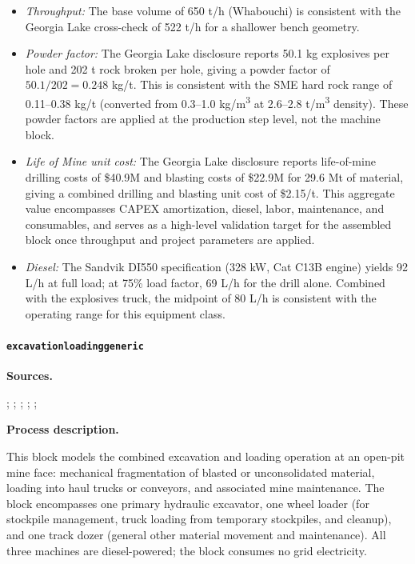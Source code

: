 \documentclass{article}
\renewcommand\_{\textunderscore\allowbreak}
\begin{document}
\begin{itemize}[noitemsep]
	\item \textit{Throughput:} The base volume of 650 t/h (Whabouchi) is consistent with the Georgia Lake cross-check of 522 t/h for a shallower bench geometry.
	\item \textit{Powder factor:} The Georgia Lake disclosure reports 50.1 kg explosives per hole and 202 t rock broken per hole, giving a powder factor of $50.1/202 = 0.248$ kg/t. This is consistent with the SME hard rock range of 0.11--0.38 kg/t (converted from 0.3--1.0 \si{kg/m^3} at 2.6--2.8 \si{t/m^3} density). These powder factors are applied at the production step level, not the machine block.
	\item \textit{Life of Mine unit cost:} The Georgia Lake disclosure reports life-of-mine drilling costs of \$40.9M and blasting costs of \$22.9M for 29.6 Mt of material, giving a combined drilling and blasting unit cost of \$2.15/t. This aggregate value encompasses CAPEX amortization, diesel, labor, maintenance, and consumables, and serves as a high-level validation target for the assembled block once throughput and project parameters are applied.
	\item \textit{Diesel:} The Sandvik DI550 specification (328 kW, Cat C13B engine) yields 92 L/h at full load; at 75\% load factor, 69 L/h for the drill alone. Combined with the explosives truck, the midpoint of 80 L/h is consistent with the operating range for this equipment class.
\end{itemize}

\clearpage
\paragraph{\texttt{excavation\_loading\_generic}}\label{app:04-methods-blockdefs-excavload}\leavevmode\par

\medskip
\noindent\textbf{Sources.}\quad

\citet{CatPerformanceHandbookfromVSTfuelconsumption20221209T212009}; \citet{warrenGeorgiaLakeLithium2022}; \citet{mccrackenNI43101Technical2023}; \citet{miningplusptyltd.SECTechnicalReport2023}; \citet{petersPlantDesignEconomics1991}; \citet{ulrichGuideChemicalEngineering1984}

\medskip
\noindent\textbf{Process description.}\quad

This block models the combined excavation and loading operation at an open-pit mine face: mechanical fragmentation of blasted or unconsolidated material, loading into haul trucks or conveyors, and associated mine maintenance. The block encompasses one primary hydraulic excavator, one wheel loader (for stockpile management, truck loading from temporary stockpiles, and cleanup), and one track dozer (general other material movement and maintenance). All three machines are diesel-powered; the block consumes no grid electricity.
\end{document}
